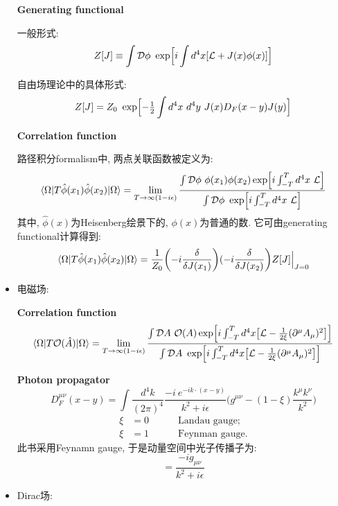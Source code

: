 \begin{itemize}
        \textbf{Generating functional}

        一般形式:
        \begin{equation*}
          Z[J]\equiv\int \mathcal{D}\phi\ \exp\Bigl[i\int d^4x[\mathcal{L}+J(x)\phi(x)]\Bigr]
        \end{equation*}

        自由场理论中的具体形式:
        \begin{equation*}
          Z[J] = Z_0\ \exp\Bigl[-\tfrac{1}{2}\int d^4x\ d^4y\ J(x)D_F(x-y)J(y)\Bigr]
        \end{equation*}

        \textbf{Correlation function}

        路径积分formalism中, 两点关联函数被定义为:
        \begin{equation*}
          \langle \Omega|T\hat{\phi}(x_1)\hat{\phi}(x_2)|\Omega \rangle = \lim_{T\rightarrow \infty(1-i\epsilon)}\frac{\int \mathcal{D}\phi\ \phi(x_1)\phi(x_2)\exp\Bigl[i\int_{-T}^{T}d^4x\ \mathcal{L}\Bigr]}{\int \mathcal{D}\phi\ \exp\Bigl[i\int_{-T}^{T}d^4x\ \mathcal{L}\Bigr]}
        \end{equation*}
        其中, $\hat{\phi}(x)$为Heisenberg绘景下的, $\phi(x)$为普通的数. 它可由generating functional计算得到:
        \begin{equation*}
          \langle \Omega|T\hat{\phi}(x_1)\hat{\phi}(x_2)|\Omega \rangle = \frac{1}{Z_0}\biggl(-i\frac{\delta}{\delta J(x_1)}\biggr)(-i\frac{\delta}{\delta J(x_2)}\biggr)Z[J]\Bigl| _{J=0}
        \end{equation*}
  \item 电磁场:

        \textbf{Correlation function}
        \begin{equation*}
          \langle \Omega|T \mathcal{O}(\hat{A})|\Omega \rangle = \lim_{T\rightarrow \infty(1-i\epsilon)}\frac{\int \mathcal{D}A\ \mathcal{O}(A)\exp\Bigl[i\int_{-T}^{T}d^4x \bigl[\mathcal{L} - \frac{1}{2\xi}(\partial^{\mu}A_\mu)^2\bigr]\Bigr]}{\int \mathcal{D}A\ \exp\Bigl[i\int_{-T}^{T}d^4x \bigl[\mathcal{L} - \frac{1}{2\xi}(\partial^{\mu}A_\mu)^2\bigr]\Bigr]}
        \end{equation*}

        \textbf{Photon propagator}
        \begin{equation*}
          D^{\mu\nu}_F(x-y) = \int \frac{d^4k}{(2\pi)^4} \frac{-i\ e^{-ik\cdot(x-y)}}{k^2+i\epsilon}\biggl(g^{\mu\nu}-(1-\xi)\frac{k^\mu k^\nu}{k^2}\biggr)
        \end{equation*}
        \begin{align*}
          \xi & = 0\qquad\quad\text{Landau gauge};  \\
          \xi & = 1\qquad\quad\text{Feynman gauge}.
        \end{align*}
        此书采用Feynamn gauge, 于是动量空间中光子传播子为:
        \begin{equation*}
          = \frac{-ig_{\mu\nu}}{k^2 + i\epsilon}
        \end{equation*}
  \item Dirac场:


\end{itemize}
